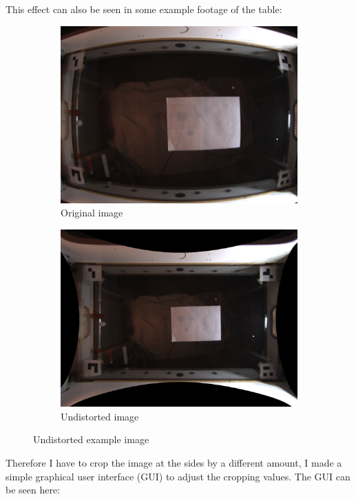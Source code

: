 This effect can also be seen in some example footage of the table:
\begin{figure}[H]
    \centering
    \begin{subfigure}{.5\textwidth}
        \centering
        \includegraphics[width=.8\textwidth]{../photos/original_example12}
        \caption[originalRainbow]{Original image}
        \label{fig:original_example8}
    \end{subfigure}%
    \begin{subfigure}{.5\textwidth}
        \centering
        \includegraphics[width=.8\textwidth]{../photos/output12}
        \caption[originalRainbow]{Undistorted image}
        \label{fig:undistorted_example8}
    \end{subfigure}
    \caption{Undistorted example image}
    \label{fig:original_undistorted_example}
\end{figure}
Therefore I have to crop the image at the sides by a different amount, I made a simple graphical user interface (GUI) to adjust the cropping values.
The GUI can be seen here:
